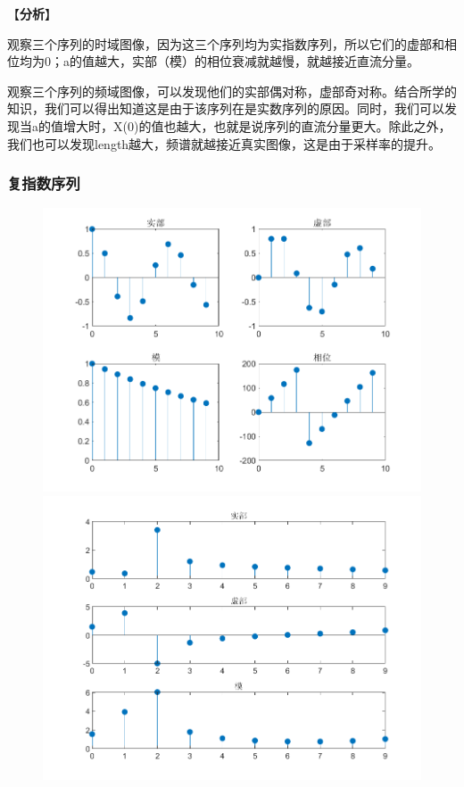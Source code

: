 \documentclass{../source/zjureport}
\begin{document}
                【\textbf{分析}】
                
                观察三个序列的时域图像，因为这三个序列均为实指数序列，所以它们的虚部和相位均为0；a的值越大，实部（模）的相位衰减就越慢，就越接近直流分量。

                观察三个序列的频域图像，可以发现他们的实部偶对称，虚部奇对称。结合所学的知识，我们可以得出知道这是由于该序列在是实数序列的原因。同时，我们可以发现当a的值增大时，X(0)的值也越大，也就是说序列的直流分量更大。除此之外，我们也可以发现length越大，频谱就越接近真实图像，这是由于采样率的提升。
            
            \subsubsection{复指数序列}
                \begin{figure}[htbp]
                    \centering
                    \begin{minipage}[t]{0.48\textwidth}
                    \centering
                    \includegraphics[width=\textwidth]{figure/复指数序列.png}
                    \end{minipage}
                    \begin{minipage}[t]{0.48\textwidth}
                    \centering
                    \includegraphics[width=\textwidth]{figure/频谱_复指数序列.png}

\end{minipage}
\end{figure}
\end{document}
